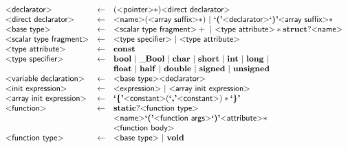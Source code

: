 \begin{figure}[h!]
\[\begin{array}{lcl}
  \text{\sf\textless declarator\textgreater} & \gets & (\text{\sf\textless pointer\textgreater}*) \text{\sf\textless direct declarator\textgreater}\\

  \text{\sf\textless direct declarator\textgreater} & \gets & \text{\sf\textless name\textgreater} (\text{\sf\textless array suffix\textgreater}*)
                                       ~|~ \text{\bf`('} \text{\sf\textless declarator\textgreater} \text{\bf`)'} \text{\sf\textless array suffix\textgreater}*\\

  \text{\sf\textless base type\textgreater} & \gets & \text{\sf\textless scalar type fragment\textgreater}+
                               ~|~ \text{\sf\textless type attribute\textgreater}* \mathbf{struct}? \text{\sf\textless name\textgreater}\\


  \text{\sf\textless scalar type fragment\textgreater} & \gets & \text{\sf\textless type specifier\textgreater} ~|~ \text{\sf\textless type attribute\textgreater} \\

  \text{\sf\textless type attribute\textgreater} & \gets & \mathbf{const} \\

  \text{\sf\textless type specifier\textgreater} & \gets & \mathbf{bool}
                                    ~|~ \mathbf{\_Bool}
                                    ~|~ \mathbf{char}
                                    ~|~ \mathbf{short}
                                    ~|~ \mathbf{int}
                                    ~|~ \mathbf{long} ~|~\\&&
                                         \mathbf{float}
                                    ~|~ \mathbf{half}
                                    ~|~ \mathbf{double}
                                    ~|~ \mathbf{signed}
                                    ~|~ \mathbf{unsigned}
  \\

  \text{\sf\textless variable declaration\textgreater} & \gets & \text{\sf\textless base type\textgreater} \text{\sf\textless declarator\textgreater}
  \\

  \text{\sf\textless init expression\textgreater} & \gets & \text{\sf\textless expression\textgreater} ~|~ \text{\sf\textless array init expression\textgreater} \\

  \text{\sf\textless array init expression\textgreater} & \gets & \text{\bf`\{'} \text{\sf\textless constant\textgreater}
                                                        (\text{\bf`,'} \text{\sf\textless constant\textgreater})*
                                             \text{\bf`\}'}
  \\
  \text{\sf\textless function\textgreater} & \gets & \mathbf{static}? \text{\sf\textless function type\textgreater} \\
                                & & \text{\sf\textless name\textgreater}
                                \text{\bf`('} \text{\sf\textless function args\textgreater} \text{\bf`)'} \text{\sf\textless attribute\textgreater}*\\
                                & & \text{\sf\textless function body\textgreater}
  \\
  \text{\sf\textless function type\textgreater} & \gets & \text{\sf\textless base type\textgreater} ~|~ \mathbf{void} \\


\end{array}\]
\end{figure}
